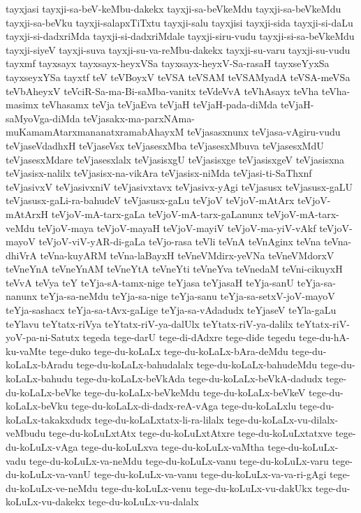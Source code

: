 {tayxjasi
tayxji-sa-beV-keMbu-dakekx
tayxji-sa-beVkeMdu
tayxji-sa-beVkeMdu
tayxji-sa-beVku
tayxji-salapxTiTxtu
tayxji-salu
tayxjisi
tayxji-sida
tayxji-si-daLu
tayxji-si-dadxriMda
tayxji-si-dadxriMdale
tayxji-siru-vudu
tayxji-si-sa-beVkeMdu
tayxji-siyeV
tayxji-suva
tayxji-su-va-reMbu-dakekx
tayxji-su-varu
tayxji-su-vudu
tayxmf
tayxsayx
tayxsayx-heyxVSa
tayxsayx-heyxV-Sa-rasaH
tayxseYyxSa
tayxseyxYSa
tayxtf
teV
teVBoyxV
teVSA
teVSAM
teVSAMyadA
teVSA-meVSa
teVbAheyxV
teVciR-Sa-ma-Bi-saMba-vanitx
teVdeVvA
teVhAsayx
teVha
teVha-masimx
teVhasamx
teVja
teVjaEva
teVjaH
teVjaH-pada-diMda
teVjaH-saMyoVga-diMda
teVjasakx-ma-parxNAma-muKamamAtarxmananatxramabAhayxM
teVjasasxnunx
teVjasa-vAgiru-vudu
teVjaseVdadhxH
teVjaseVsx
teVjasesxMba
teVjasesxMbuva
teVjasesxMdU
teVjasesxMdare
teVjasesxlalx
teVjasisxgU
teVjasisxge
teVjasisxgeV
teVjasisxna
teVjasisx-nalilx
teVjasisx-na-vikAra
teVjasisx-niMda
teVjasi-ti-SaThxnf
teVjasivxV
teVjasivxniV
teVjasivxtavx
teVjasivx-yAgi
teVjasusx
teVjasusx-gaLU
teVjasusx-gaLi-ra-bahudeV
teVjasusx-gaLu
teVjoV
teVjoV-mAtArx
teVjoV-mAtArxH
teVjoV-mA-tarx-gaLa
teVjoV-mA-tarx-gaLanunx
teVjoV-mA-tarx-veMdu
teVjoV-maya
teVjoV-mayaH
teVjoV-mayiV
teVjoV-ma-yiV-vAkf
teVjoV-mayoV
teVjoV-viV-yAR-di-gaLa
teVjo-rasa
teVli
teVnA
teVnAginx
teVna
teVna-dhiVrA
teVna-kuyARM
teVna-laBayxH
teVneVMdirx-yeVNa
teVneVMdorxV
teVneYnA
teVneYnAM
teVneYtA
teVneYti
teVneYva
teVnedaM
teVni-cikuyxH
teVvA
teVya
teY
teYja-sA-tamx-nige
teYjasa
teYjasaH
teYja-sanU
teYja-sa-nanunx
teYja-sa-neMdu
teYja-sa-nige
teYja-sanu
teYja-sa-setxV-joV-mayoV
teYja-sashacx
teYja-sa-tAvx-gaLige
teYja-sa-vAdadudx
teYjaseV
teYla-gaLu
teYlavu
teYtatx-riVya
teYtatx-riV-ya-dalUlx
teYtatx-riV-ya-dalilx
teYtatx-riV-yoV-pa-ni-Satutx
tegeda
tege-darU
tege-di-dAdxre
tege-dide
tegedu
tege-du-hA-ku-vaMte
tege-duko
tege-du-koLaLx
tege-du-koLaLx-bAra-deMdu
tege-du-koLaLx-bAradu
tege-du-koLaLx-bahudalalx
tege-du-koLaLx-bahudeMdu
tege-du-koLaLx-bahudu
tege-du-koLaLx-beVkAda
tege-du-koLaLx-beVkA-dadudx
tege-du-koLaLx-beVke
tege-du-koLaLx-beVkeMdu
tege-du-koLaLx-beVkeV
tege-du-koLaLx-beVku
tege-du-koLaLx-di-dadx-reA-vAga
tege-du-koLaLxlu
tege-du-koLaLx-takakxdudx
tege-du-koLaLxtatx-li-ra-lilalx
tege-du-koLaLx-vu-dilalx-veMbudu
tege-du-koLuLxtAtx
tege-du-koLuLxtAtxre
tege-du-koLuLxtatxve
tege-du-koLuLx-vAga
tege-du-koLuLxva
tege-du-koLuLx-vaMtha
tege-du-koLuLx-vadu
tege-du-koLuLx-va-neMdu
tege-du-koLuLx-vanu
tege-du-koLuLx-varu
tege-du-koLuLx-va-vanU
tege-du-koLuLx-va-vanu
tege-du-koLuLx-va-va-ri-gAgi
tege-du-koLuLx-ve-neMdu
tege-du-koLuLx-venu
tege-du-koLuLx-vu-dakUkx
tege-du-koLuLx-vu-dakekx
tege-du-koLuLx-vu-dalalx
}
